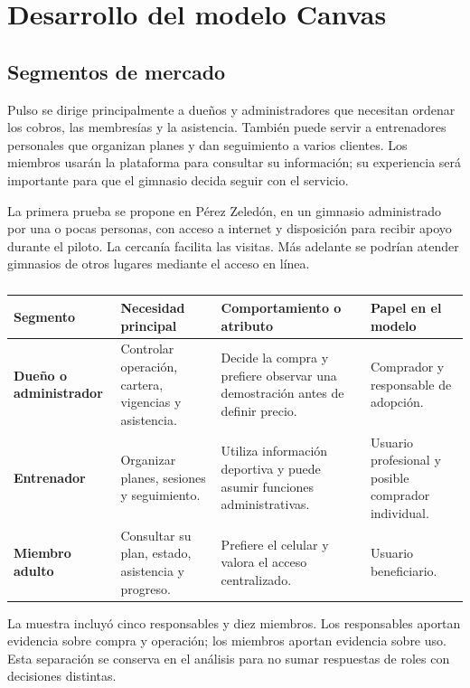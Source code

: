 \section{Desarrollo del modelo Canvas}

\subsection{Segmentos de mercado}

Pulso se dirige principalmente a dueños y administradores que necesitan ordenar
los cobros, las membresías y la asistencia. También puede servir a entrenadores
personales que organizan planes y dan seguimiento a varios clientes. Los
miembros usarán la plataforma para consultar su información; su experiencia
será importante para que el gimnasio decida seguir con el servicio.

La primera prueba se propone en Pérez Zeledón, en un gimnasio administrado por
una o pocas personas, con acceso a internet y disposición para recibir apoyo
durante el piloto. La cercanía facilita las visitas. Más adelante se podrían
atender gimnasios de otros lugares mediante el acceso en línea.

\begin{table}[htbp]
\caption{Segmentos y necesidades iniciales}
\begin{tabularx}{\textwidth}{>{\bfseries}p{2.7cm}X X X}
\toprule
Segmento & Necesidad principal & Comportamiento o atributo & Papel en el modelo \\
\midrule
Dueño o administrador & Controlar operación, cartera, vigencias y asistencia. & Decide la compra y prefiere observar una demostración antes de definir precio. & Comprador y responsable de adopción. \\
Entrenador & Organizar planes, sesiones y seguimiento. & Utiliza información deportiva y puede asumir funciones administrativas. & Usuario profesional y posible comprador individual. \\
Miembro adulto & Consultar su plan, estado, asistencia y progreso. & Prefiere el celular y valora el acceso centralizado. & Usuario beneficiario. \\
\bottomrule
\end{tabularx}
\caption*{\fuentepropia}
\end{table}

La muestra incluyó cinco responsables y diez miembros. Los responsables aportan
evidencia sobre compra y operación; los miembros aportan evidencia sobre uso.
Esta separación se conserva en el análisis para no sumar respuestas de roles con
decisiones distintas.

